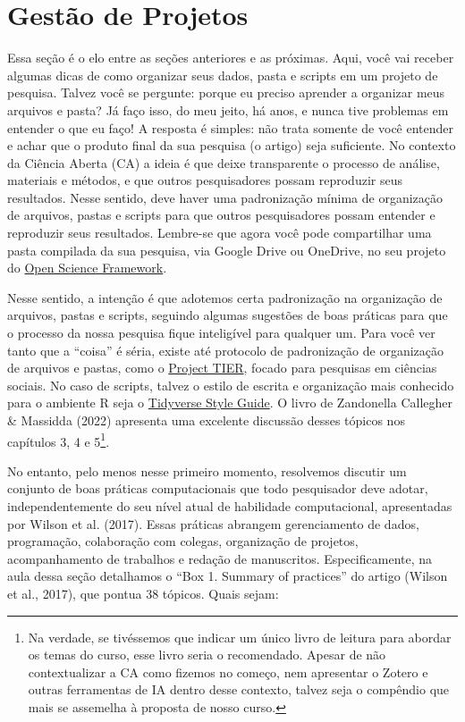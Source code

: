 \documentclass[
  a4paper,
]{book}
\begin{document}

\chapter{Gestão de Projetos}\label{sec-project}

Essa seção é o elo entre as seções anteriores e as próximas. Aqui, você
vai receber algumas dicas de como organizar seus dados, pasta e scripts
em um projeto de pesquisa. Talvez você se pergunte: porque eu preciso
aprender a organizar meus arquivos e pasta? Já faço isso, do meu jeito,
há anos, e nunca tive problemas em entender o que eu faço! A resposta é
simples: não trata somente de você entender e achar que o produto final
da sua pesquisa (o artigo) seja suficiente. No contexto da Ciência
Aberta (CA) a ideia é que deixe transparente o processo de análise,
materiais e métodos, e que outros pesquisadores possam reproduzir seus
resultados. Nesse sentido, deve haver uma padronização mínima de
organização de arquivos, pastas e scripts para que outros pesquisadores
possam entender e reproduzir seus resultados. Lembre-se que agora você
pode compartilhar uma pasta compilada da sua pesquisa, via Google Drive
ou OneDrive, no seu projeto do \href{https://osf.io/}{Open Science
Framework}.

Nesse sentido, a intenção é que adotemos certa padronização na
organização de arquivos, pastas e scripts, seguindo algumas sugestões de
boas práticas para que o processo da nossa pesquisa fique inteligível
para qualquer um. Para você ver tanto que a ``coisa'' é séria, existe
até protocolo de padronização de organização de arquivos e pastas, como
o \href{https://www.projecttier.org/}{Project TIER}, focado para
pesquisas em ciências sociais. No caso de scripts, talvez o estilo de
escrita e organização mais conhecido para o ambiente R seja o
\href{https://style.tidyverse.org/}{Tidyverse Style Guide}. O livro de
Zandonella Callegher \& Massidda (2022) apresenta uma excelente
discussão desses tópicos nos capítulos 3, 4 e 5\footnote{Na verdade, se
  tivéssemos que indicar um único livro de leitura para abordar os temas
  do curso, esse livro seria o recomendado. Apesar de não contextualizar
  a CA como fizemos no começo, nem apresentar o Zotero e outras
  ferramentas de IA dentro desse contexto, talvez seja o compêndio que
  mais se assemelha à proposta de nosso curso.}.

No entanto, pelo menos nesse primeiro momento, resolvemos discutir um
conjunto de boas práticas computacionais que todo pesquisador deve
adotar, independentemente do seu nível atual de habilidade
computacional, apresentadas por Wilson et al. (2017). Essas práticas
abrangem gerenciamento de dados, programação, colaboração com colegas,
organização de projetos, acompanhamento de trabalhos e redação de
manuscritos. Especificamente, na aula dessa seção detalhamos o ``Box 1.
Summary of practices'' do artigo (Wilson et al., 2017), que pontua 38
tópicos. Quais sejam:
\end{document}
